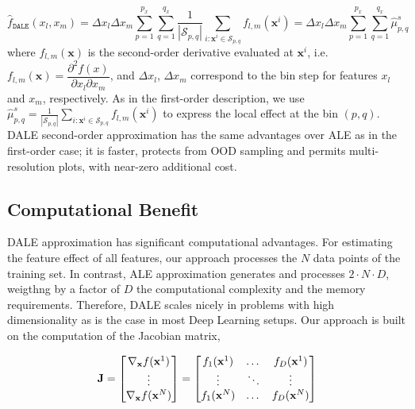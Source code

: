 \documentclass[wcp]{jmlr}
\newcommand{\dale}{\hat{f}_{\mathtt{DALE}}}
\newcommand{\xb}{\mathbf{x}} \newcommand{\R}{\mathbb{R}}
\begin{document}
\begin{equation}
  \dale(x_l, x_m)
  = \Delta x_l \Delta x_m \sum_{p=1}^{p_x} \sum_{q=1}^{q_x}
  \frac{1}{|\mathcal{S}_{p,q}|} \sum_{i:\xb^i \in \mathcal{S}_{p,q}}f_{l,m}(\xb^i)
  = \Delta x_l \Delta x_m \sum_{p=1}^{p_x} \sum_{q=1}^{q_x} \hat{\mu}_{p,q}^s
  \label{eq:DALE-2}
\end{equation}
%
where \( f_{l,m}(\xb) \) is the second-order derivative evaluated at
\(\xb^i\), i.e.
\( f_{l,m}(\xb) = \dfrac{\partial^2f(x)}{\partial x_l \partial x_m}
\), and \(\Delta x_l\), \(\Delta x_m\) correspond to the bin step for
features \(x_l\) and \(x_m\), respectively. As in the first-order
description, we use
\( \hat{\mu}_{p,q}^s = \frac{1}{|\mathcal{S}_{p,q}|} \sum_{i:\xb^i \in
  \mathcal{S}_{p,q}}f_{l,m}(\xb^i)\) to express the local effect at
the bin \( (p, q) \). DALE second-order approximation has the same
advantages over ALE as in the first-order case; it is faster, protects
from OOD sampling and permits multi-resolution plots, with near-zero
additional cost.

\subsection{Computational Benefit}
\label{sec:4-2-computational}

DALE approximation has significant computational advantages. For
estimating the feature effect of all features, our approach processes
the \(N\) data points of the training set. In contrast, ALE
approximation generates and processes \(2 \cdot N \cdot D\), weigthng
by a factor of \(D\) the computational complexity and the memory
requirements. Therefore, DALE scales nicely in problems with high
dimensionality as is the case in most Deep Learning setups. Our
approach is built on the computation of the Jacobian matrix,

\begin{equation} \Jac =
  \begin{bmatrix} \nabla_{\xb}f(\xb^1) \\ \vdots \\ \nabla_{\xb}f(\xb^N)
  \end{bmatrix} =
  \begin{bmatrix} f_1(\xb^1) & \dots & f_D(\xb^1)\\ \vdots & \ddots & \vdots \\ f_1(\xb^N) & \dots & f_D(\xb^N)
  \end{bmatrix}
\label{eq:jacobian}
\end{equation}
\end{document}
